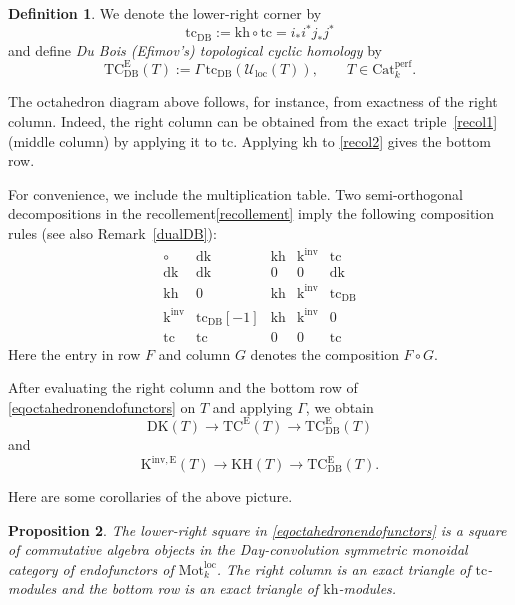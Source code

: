 \documentclass{amsart}
\theoremstyle{plain}
\newtheorem{prop}{Proposition}[section]
\theoremstyle{definition}
\newtheorem{defi}[prop]{Definition}
\newcommand{\Catperf}{\mathrm{Cat}^{\mathrm{perf}}}
\newcommand{\Motloc}{\mathrm{Mot}^{\mathrm{loc}}}
\newcommand{\Uloc}{\mathcal U_{\mathrm{loc}}}
\newcommand{\TC}{\mathrm{TC}}
\newcommand{\K}{\mathrm{K}}
\newcommand{\KH}{\mathrm{KH}}
\newcommand{\DK}{\mathrm{DK}}
\newcommand{\dk}{\mathrm{dk}}
\newcommand{\kh}{\mathrm{kh}}
\newcommand{\tc}{\mathrm{tc}}
\newcommand{\kinv}{\mathrm{k}^{\mathrm{inv}}}
\newcommand{\DB}{\mathrm{DB}}
\begin{document}
\begin{defi}\label{deftcdb}
We denote the lower-right corner by
\[
\tc_{\DB}:=\kh\circ \tc=i_*i^*j_*j^*
\]
and define \emph{Du Bois (Efimov's) topological cyclic homology} by
\[
\TC^{\mathrm{E}}_{\DB}(T):=\Gamma\,\tc_{\DB}(\Uloc(T)),\qquad T\in\Catperf_k.
\]
\end{defi}

The octahedron diagram above follows, for instance, from exactness of the right column. Indeed, the right column can be obtained from the exact triple~\eqref{recol1} (middle column) by applying it to $\tc$. Applying $\kh$ to \eqref{recol2} gives the bottom row.

For convenience, we include the multiplication table. Two semi-orthogonal decompositions in the recollement\eqref{recollement} imply the following composition rules (see also Remark~\ref{dualDB}):
\[
\boxed{
\begin{array}{c|cccc}
\circ & \dk & \kh & \kinv & \tc\\
\hline
\dk
& \dk
& 0
& 0
& \dk
\\[2mm]
\kh
& 0
& \kh
& \kinv
& \tc_{\DB}
\\[2mm]
\kinv
& \tc_{\DB}[-1]
& \kh
& \kinv
& 0
\\[2mm]
\tc
& \tc
& 0
& 0
& \tc
\end{array}}
\]
Here the entry in row $F$ and column $G$ denotes the composition
$F\circ G$.

After evaluating the right column and the bottom row of \eqref{eqoctahedronendofunctors} on $T$ and applying $\Gamma$, we obtain
\begin{equation}\label{eqDBtwotrianglesglobal}
\DK(T)\longrightarrow \TC^{\mathrm{E}}(T)\longrightarrow \TC^{\mathrm{E}}_{\DB}(T)
\end{equation}
and
\[
\K^{\mathrm{inv},\mathrm{E}}(T)\longrightarrow \KH(T)\longrightarrow \TC^{\mathrm{E}}_{\DB}(T).
\]

Here are some corollaries of the above picture.

\begin{prop}\label{multiplicativeoctahedron}
The lower-right square in \eqref{eqoctahedronendofunctors} is a square of commutative algebra objects in the Day-convolution symmetric monoidal category of endofunctors of $\Motloc_k$.  The right column is an exact triangle of
$\tc$-modules and the bottom row is an exact triangle of $\kh$-modules.
\end{prop}
\end{document}
